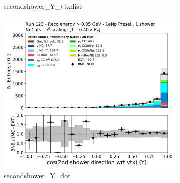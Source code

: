 \begin{figure}[H]
\begin{subfigure}{0.3\textwidth}
    \caption{secondshower\_Y\_vtxdist}
    \end{subfigure}
    \begin{subfigure}{0.3\textwidth}
    \includegraphics[width=1.0\textwidth]{Sidebands/Figures/1eNp/HighEnergy/HiEext_NPOneShr_None_pi0e040/secondshower_Y_dot.pdf}
    \caption{secondshower\_Y\_dot}
    \end{subfigure}
    \caption{} 
    \label{fig:HE_1eNp_4}
\end{figure}

